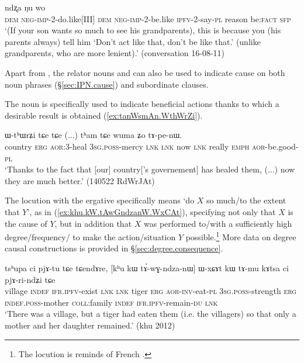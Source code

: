 \begin{exe}
\ex \label{ex:tutWtinW.ndzxa.Nu}
 ndʐa ŋu wo \\
\textsc{dem} \textsc{neg}-\textsc{imp}-2-do.like[III] \textsc{dem}  \textsc{neg}-\textsc{imp}-2-be.like \textsc{ipfv}-2-say-\textsc{pl} reason be:\textsc{fact} \textsc{sfp} \\
\glt `(If your son wants so much to see his grandparents), this is because you (his parents always) tell him `Don't act like that, don't be like that.' (unlike grandparents, who are more lenient).' (conversation 16-08-11)
\end{exe}

Apart from , the relator nouns  and 
can also be used to indicate cause on both noun phrases (§\ref{sec:IPN.cause}) and subordinate clauses.

The noun  is specifically used to indicate beneficial actions thanks to which a desirable result is obtained (\ref{ex:tanWsmAn.WthWrZi}).

\begin{exe}
\ex \label{ex:tanWsmAn.WthWrZi}
 ɯ-tʰɯrʑi tɕe tɕe  (...) tʰam tɕe wuma ʑo tɤ-pe-nɯ. \\
country \textsc{erg} \textsc{aor}:3\flobv{}-heal \textsc{3sg}.\textsc{poss}-mercy \textsc{lnk} \textsc{lnk} { } now \textsc{lnk} really \textsc{emph} \textsc{aor}-be.good-\textsc{pl} \\
\glt `Thanks to the fact that [our] country['s governement] has healed them, (...) now they are much better.' (140522 RdWrJAt)
\end{exe}

The locution  with the ergative specifically means `do $X$ so much/to the extent that $Y$', as in (\ref{ex:khu.kW.tAwGndzanW.WxCAt}), specifying not only that $X$ is the cause of $Y$, but in addition that $X$ was performed to/with a sufficiently high degree/frequency/ to make the action/situation $Y$ possible.\footnote{The locution  is reminds of French . } More data on degree causal constructions is provided in §\ref{sec:degree.consequence}.

\begin{exe}
\ex \label{ex:khu.kW.tAwGndzanW.WxCAt}
\gll tsʰupa ci pjɤ-tu tɕe tɕendɤre, [kʰu kɯ tɤ́-wɣ-ndza-nɯ] ɯ-xɕɤt kɯ tɤ-mu kɤtsa ci pjɤ-ri-ndʑi tɕe \\
village \textsc{indef} \textsc{ifr}.\textsc{ipfv}-exist \textsc{lnk} \textsc{lnk} tiger \textsc{erg} \textsc{aor}-\textsc{inv}-eat-\textsc{pl} \textsc{3sg}.\textsc{poss}-strength \textsc{erg} \textsc{indef}.\textsc{poss}-mother \textsc{coll}:family \textsc{indef} \textsc{ifr}.\textsc{ipfv}-remain-\textsc{du} \textsc{lnk} \\
\glt `There was a village, but a tiger had eaten them (i.e. the villagers) so that only a mother and her daughter remained.' (khu 2012)
\end{exe}
 

